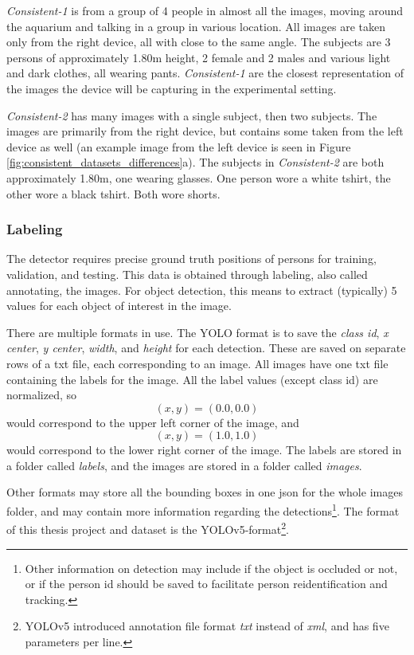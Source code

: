 \textit{Consistent-1} is from a group of 4 people in almost all the images, moving around the aquarium and talking in a group in various location. All images are taken only from the right device, all with close to the same angle. The subjects are 3 persons of approximately 1.80m height, 2 female and 2 males and various light and dark clothes, all wearing pants. \textit{Consistent-1} are the closest representation of the images the device will be capturing in the experimental setting.

\textit{Consistent-2} has many images with a single subject, then two subjects. The images are primarily from the right device, but contains some taken from the left device as well (an example image from the left device is seen in Figure \ref{fig:consistent_datasets_differences}a). The subjects in \textit{Consistent-2 }are both approximately 1.80m, one wearing glasses. One person wore a white tshirt, the other wore a black tshirt. Both wore shorts. 

\subsubsection{Labeling}
\label{sec:labeling}
The detector requires precise ground truth positions of persons for training, validation, and testing. This data is obtained through labeling, also called annotating, the images. For object detection, this means to extract (typically) 5 values for each object of interest in the image. 

There are multiple formats in use. The YOLO format is to save the \textit{class id}, \textit{x center}, \textit{y center}, \textit{width}, and \textit{height} for each detection. These are saved on separate rows of a txt file, each corresponding to an image. All images have one txt file containing the labels for the image. All the label values (except class id) are normalized, so \[(x,y)=(0.0, 0.0)\] would correspond to the upper left corner of the image, and \[(x,y)=(1.0,1.0)\] would correspond to the lower right corner of the image. The labels are stored in a folder called \textit{labels}, and the images are stored in a folder called \textit{images}. 

Other formats may store all the bounding boxes in one json for the whole images folder, and may contain more information regarding the detections\footnote{Other information on detection may include if the object is occluded or not, or if the person id should be saved to facilitate person reidentification and tracking.}. The format of this thesis project and dataset is the YOLOv5-format\footnote{YOLOv5 introduced annotation file format \textit{txt} instead of \textit{xml}, and has five parameters per line.}. 

